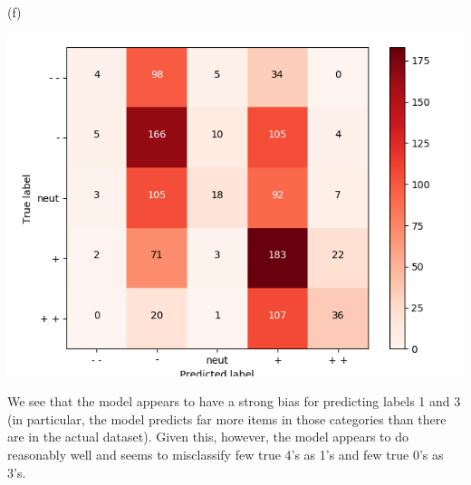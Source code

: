 \documentclass{article}
\begin{document}
(f)

\includegraphics{assignment1/q4_dev_conf.png}

We see that the model appears to have a strong bias for predicting labels 1 and 3 (in particular, the model predicts far more items in those categories than there are in the actual dataset). Given this, however, the model appears to do reasonably well and seems to misclassify few true 4's as 1's and few true 0's as 3's.
\end{document}
